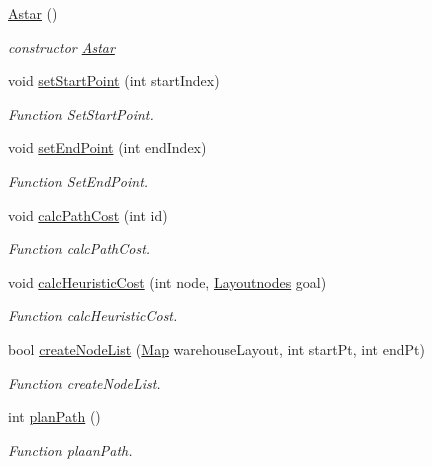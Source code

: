 \begin{DoxyCompactItemize}
\item 
\hyperlink{classAstar_a0e59f5e736107ddea7cc16dd5e4a2d88}{Astar} ()
\begin{DoxyCompactList}\small\item\em constructor \hyperlink{classAstar}{Astar} \end{DoxyCompactList}\item 
void \hyperlink{classAstar_ab3ad1479ec00c63b1baff5f8eb67c660}{set\+Start\+Point} (int start\+Index)
\begin{DoxyCompactList}\small\item\em Function Set\+Start\+Point. \end{DoxyCompactList}\item 
void \hyperlink{classAstar_ac50aa092d84b977a004e74fdda40307b}{set\+End\+Point} (int end\+Index)
\begin{DoxyCompactList}\small\item\em Function Set\+End\+Point. \end{DoxyCompactList}\item 
void \hyperlink{classAstar_a28be3eafec9143958bab3164cef78342}{calc\+Path\+Cost} (int id)
\begin{DoxyCompactList}\small\item\em Function calc\+Path\+Cost. \end{DoxyCompactList}\item 
void \hyperlink{classAstar_a9963e9a8ba32f78b01d35b8d9cfc6900}{calc\+Heuristic\+Cost} (int node, \hyperlink{classLayoutnodes}{Layoutnodes} goal)
\begin{DoxyCompactList}\small\item\em Function calc\+Heuristic\+Cost. \end{DoxyCompactList}\item 
bool \hyperlink{classAstar_acdbb3ef57940f83b0608c97450d084bc}{create\+Node\+List} (\hyperlink{classMap}{Map} warehouse\+Layout, int start\+Pt, int end\+Pt)
\begin{DoxyCompactList}\small\item\em Function create\+Node\+List. \end{DoxyCompactList}\item 
int \hyperlink{classAstar_a0d1f14dee942f1afd329ffd52c1716a1}{plan\+Path} ()
\begin{DoxyCompactList}\small\item\em Function plaan\+Path. \end{DoxyCompactList}\item 

\end{DoxyCompactItemize}
